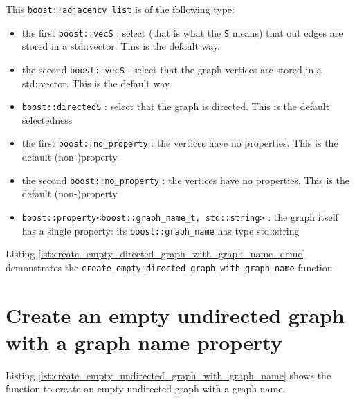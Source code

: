 This \verb;boost::adjacency_list; is of the following type:

\begin{itemize}
  \item the first \verb;boost::vecS; : 
    select (that is what the \verb;S;  means) 
    that out edges are stored in a std::vector.
    This is the default way.
  \item the second \verb;boost::vecS; : 
    select that the graph vertices are stored in a std::vector.
    This is the default way.
  \item \verb;boost::directedS; : 
    select that the graph is directed.
    This is the default selectedness
  \item the first \verb;boost::no_property; : 
    the vertices have no properties.
    This is the default (non-)property
  \item the second \verb;boost::no_property; : 
    the vertices have no properties.
    This is the default (non-)property
  \item
    \verb;boost::property<boost::graph_name_t, std::string>; 
    : 
    the graph itself has a single property: 
    its \verb;boost::graph_name;  has type std::string
\end{itemize}

Listing 
\ref{lst:create_empty_directed_graph_with_graph_name_demo}
demonstrates the \verb;create_empty_directed_graph_with_graph_name; function.



\section{Create an empty undirected graph with a graph name property}
\label{subsec:create_empty_undirected_graph_with_graph_name}

Listing 
\ref{lst:create_empty_undirected_graph_with_graph_name}
shows the function to create an empty undirected graph with a graph name.

